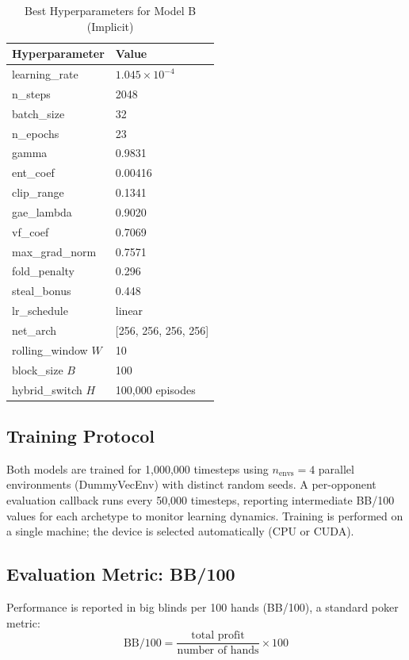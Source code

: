 \documentclass[conference]{IEEEtran}
\begin{document}
\begin{table}[htbp]
\centering
\caption{Best Hyperparameters for Model B (Implicit)}
\label{tab:best_params}
\begin{tabular}{|l|l|}
\hline
Hyperparameter & Value \\
\hline
learning\_rate      & $1.045 \times 10^{-4}$ \\
n\_steps            & 2048 \\
batch\_size         & 32 \\
n\_epochs           & 23 \\
gamma               & 0.9831 \\
ent\_coef           & 0.00416 \\
clip\_range         & 0.1341 \\
gae\_lambda         & 0.9020 \\
vf\_coef            & 0.7069 \\
max\_grad\_norm     & 0.7571 \\
fold\_penalty       & 0.296 \\
steal\_bonus        & 0.448 \\
lr\_schedule        & linear \\
net\_arch           & [256, 256, 256, 256] \\
rolling\_window $W$ & 10 \\
block\_size $B$     & 100 \\
hybrid\_switch $H$  & 100{,}000 episodes \\
\hline
\end{tabular}
\end{table}

\subsection{Training Protocol}

Both models are trained for 1{,}000{,}000 timesteps using
$n_\text{envs} = 4$ parallel environments (DummyVecEnv) with
distinct random seeds. A per-opponent evaluation callback runs every
50{,}000 timesteps, reporting intermediate BB/100 values for each
archetype to monitor learning dynamics. Training is performed on a
single machine; the device is selected automatically (CPU or CUDA).

\subsection{Evaluation Metric: BB/100}

Performance is reported in big blinds per 100 hands
(BB/100), a standard poker metric:
\begin{equation}
\text{BB/100} = \frac{\text{total profit}}{\text{number of hands}} \times 100
\label{eq:bb100}
\end{equation}
\end{document}
